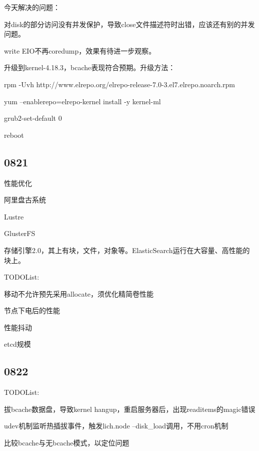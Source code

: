 今天解决的问题：
\begin{enumbox}
\item 对disk的部分访问没有并发保护，导致close文件描述符时出错，应该还有别的并发问题。
\item write EIO不再coredump，效果有待进一步观察。
\end{enumbox}

升级到kernel-4.18.3，bcache表现符合预期。升级方法：
\begin{itembox}
\item rpm -Uvh http://www.elrepo.org/elrepo-release-7.0-3.el7.elrepo.noarch.rpm
\item yum --enablerepo=elrepo-kernel install -y kernel-ml
\item grub2-set-default 0
\item reboot
\end{itembox}

\subsection{0821}

性能优化
\begin{enumbox}
\item 阿里盘古系统
\item Lustre
\item GlusterFS
\end{enumbox}

存储引擎2.0，其上有块，文件，对象等。ElasticSearch运行在大容量、高性能的块上。

TODOList:
\begin{enumbox}
\item 移动不允许预先采用allocate，须优化精简卷性能
\item 节点下电后的性能
\item 性能抖动
\item etcd规模
\end{enumbox}

\subsection{0822}

TODOList:
\begin{enumbox}
\item 拔bcache数据盘，导致kernel hangup，重启服务器后，出现readitems的magic错误
\item udev机制监听热插拔事件，触发lich.node --disk\_load调用，不用cron机制
\item 比较bcache与无bcache模式，以定位问题
\end{enumbox}


